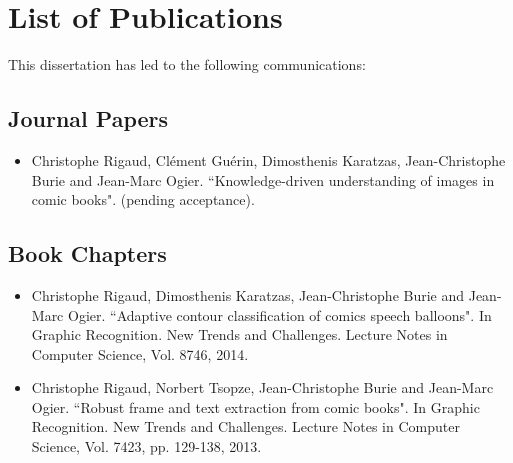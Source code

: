 \chapter{List of Publications}
\label{app:publications}


This dissertation has led to the following communications:

\section*{Journal Papers}

\begin{itemize}

\item Christophe Rigaud, Cl{\'e}ment Gu{\'e}rin, Dimosthenis Karatzas, Jean-Christophe Burie and Jean-Marc Ogier. ``Knowledge-driven understanding of images in comic books". (pending acceptance).
\vspace*{.3cm}

\vspace*{.3cm}

\end{itemize}

\section*{Book Chapters}

\begin{itemize}

\item Christophe Rigaud, Dimosthenis Karatzas, Jean-Christophe Burie and Jean-Marc Ogier. ``Adaptive contour classification of comics speech balloons". In Graphic Recognition. New Trends and Challenges. Lecture Notes in Computer Science, Vol. 8746, 2014.
\vspace*{.3cm}

\item Christophe Rigaud, Norbert Tsopze, Jean-Christophe Burie and Jean-Marc Ogier. ``Robust frame and text extraction from comic books". In Graphic Recognition. New Trends and Challenges. Lecture Notes in Computer Science, Vol. 7423, pp. 129-138, 2013.
\vspace*{.3cm}

\end{itemize}

